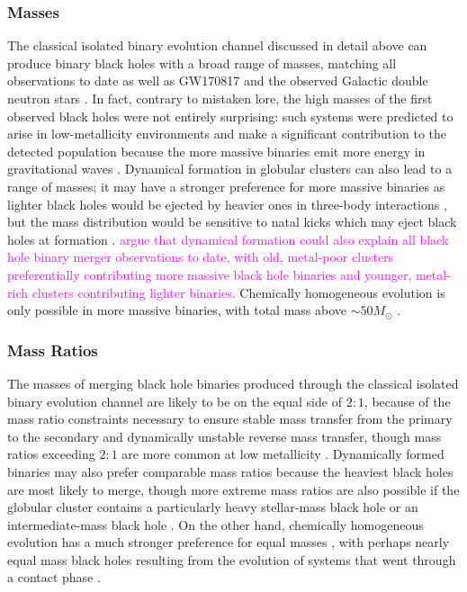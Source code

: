 \documentclass[iop,onecolumn]{revtex4}
\newcommand{\ilya}[1]{\textcolor{magenta}{#1}}
\begin{document}
\subsubsection{Masses}
The classical isolated binary evolution channel discussed in detail above can produce binary black holes with a broad range of masses, matching all observations to date \citep[e.g.,][]{Stevenson:2017} as well as GW170817 and the observed Galactic double neutron stars \citep[e.g.,][]{Kruckow:2018,VignaGomez:2018}.  In fact, contrary to mistaken lore, the high masses of the first observed black holes were not entirely surprising: such systems were predicted to arise in low-metallicity environments and make a significant contribution to the detected population because the more massive binaries emit more energy in gravitational waves \citep{Dominik:2014}.  Dynamical formation in globular clusters can also lead to a range of masses; it may have a stronger preference for more massive binaries as lighter black holes would be ejected by heavier ones in three-body interactions \citep{Rodriguez:2015}, but the mass distribution would be sensitive to natal kicks which may eject black holes at formation \citep{Zevin:2017}.  \ilya{\citet{Chatterjee:2017} argue that dynamical formation could also explain all black hole binary merger observations to date, with old, metal-poor clusters preferentially contributing more massive black hole binaries and younger, metal-rich clusters contributing lighter binaries.}  Chemically homogeneous evolution is only possible in more massive binaries, with total mass above $\sim 50 M_\odot$ \citep{MandeldeMink:2016,Marchant:2016}.

\subsubsection{Mass Ratios}
The masses of merging black hole binaries produced through the classical isolated binary evolution channel are likely to be on the equal side of $2:1$, because of the mass ratio constraints necessary to ensure stable mass transfer from the primary to the secondary and dynamically unstable reverse mass transfer, though mass ratios exceeding $2:1$ are more common at low metallicity \citep{Dominik:2012,Stevenson:2017}.  Dynamically formed binaries may also prefer comparable mass ratios because the heaviest black holes are most likely to merge, though more extreme mass ratios are also possible if the globular cluster contains a particularly heavy stellar-mass black hole or an intermediate-mass black hole \citep{Mandel:2008,Belczynski:2014VMS}.  On the other hand, chemically homogeneous evolution has a much stronger preference for equal masses \citep{MandeldeMink:2016}, with perhaps nearly equal mass black holes resulting from the evolution of systems that went through a contact phase \citep{Marchant:2016}.  
\end{document}
